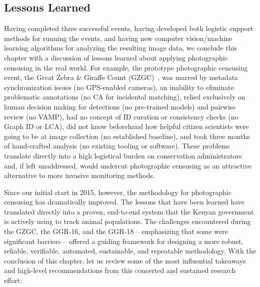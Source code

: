 \subsection{Lessons Learned}

Having completed three successful events, having developed both logistic support methods for running the events, and having new computer vision/machine learning algorithms for analyzing the resulting image data, we conclude this chapter with a discussion of lessons learned about applying photographic censusing in the real world.  For example, the prototype photographic censusing event, the Great Zebra \& Giraffe Count (GZGC)~\cite{parham_photographic_2015}, was marred by metadata synchronization issues (no GPS-enabled cameras), an inability to eliminate problematic annotations (no CA for incidental matching), relied exclusively on human decision making for detections (no pre-trained models) and pairwise review (no VAMP), had no concept of ID curation or consistency checks (no Graph ID or LCA), did not know beforehand how helpful citizen scientists were going to be at image collection (no established baseline), and took three months of hand-crafted analysis (no existing tooling or software).  These problems translate directly into a high logistical burden on conservation administrators and, if left unaddressed, would undercut photographic censusing as an attractive alternative to more invasive monitoring methods.

Since our initial start in 2015, however, the methodology for photographic censusing has dramatically improved.  The lessons that have been learned have translated directly into a proven, end-to-end system that the Kenyan government is actively using to track animal populations.  The challenges encountered during the GZGC, the GGR-16, and the GGR-18 -- emphasizing that some were significant barriers -- offered a guiding framework for designing a more robust, reliable, verifiable, automated, sustainable, and repeatable methodology.  With the conclusion of this chapter, let us review some of the most influential takeaways and high-level recommendations from this concerted and sustained research effort:

